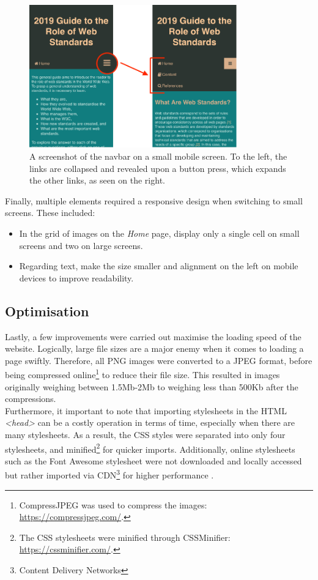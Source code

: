 \documentclass[letterpaper,12pt]{article}
\begin{document}
\begin{figure}[h] 
\centerline{\includegraphics[width=0.8\textwidth]{report/images/mobile-navbar.png}}
\caption{\label{fig:mobile-navbar}A screenshot of the navbar on a small mobile screen. To the left, the links are collapsed and revealed upon a button press, which expands the other links, as seen on the right.}
\end{figure}

Finally, multiple elements required a responsive design when switching to small screens. These included:
\begin{itemize}
    \item In the grid of images on the \textit{Home} page, display only a single cell on small screens and two on large screens.
    \item Regarding text, make the size smaller and alignment on the left on mobile devices to improve readability.
\end{itemize}

\subsection{Optimisation}

Lastly, a few improvements were carried out maximise the loading speed of the website. Logically, large file sizes are a major enemy when it comes to loading a page swiftly. Therefore, all PNG images were converted to a JPEG format, before being compressed online\footnote{CompressJPEG was used to compress the images: \url{https://compressjpeg.com/}.} to reduce their file size. This resulted in images originally weighing between 1.5Mb-2Mb to weighing less than 500Kb after the compressions.\\

Furthermore, it important to note that importing stylesheets in the HTML \textit{\textless head\textgreater} can be a costly operation in terms of time, especially when there are many stylesheets. As a result, the CSS styles were separated into only four stylesheets, and minified\footnote{The CSS stylesheets were minified through CSSMinifier: \url{https://cssminifier.com/}.} for quicker imports. Additionally, online stylesheets such as the Font Awesome stylesheet \cite{w3-css-icons} were not downloaded and locally accessed but rather imported via CDN\footnote{Content Delivery Networks} for higher performance \cite{dilley2002globally}.
\end{document}
